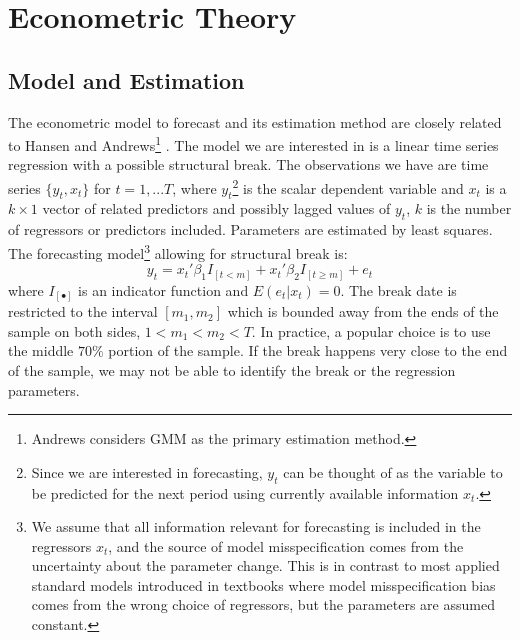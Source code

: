 \section{Econometric Theory}
\subsection{Model and Estimation}
The econometric model to forecast and its estimation method are closely related to Hansen \cite{hansen2009averaging} and Andrews\footnote{Andrews considers GMM as the primary estimation method.} \cite{andrews93}. The model we are interested in is a linear time series regression with a possible structural break. The observations we have are time series $\{y_t,x_t\}$ for $t = 1,...T$, where $y_t$\footnote{Since we are interested in forecasting, $y_t$ can be thought of as the variable to be predicted for the next period using currently available information $x_t$.} is the scalar dependent variable and $x_t$ is a $k\times 1$ vector of related predictors and possibly lagged values of $y_t$, $k$ is the number of regressors or predictors included. Parameters are estimated by least squares. The forecasting model\footnote{We assume that all information relevant for forecasting is included in the regressors $x_t$, and the source of model misspecification comes from the uncertainty about the parameter change. This is in contrast to most applied standard models introduced in textbooks where model misspecification bias comes from the wrong choice of regressors, but the parameters are assumed constant.} allowing for structural break is:
\begin{equation}
	y_t = x_t'\beta_1 I_{[t<m]} + x_t'\beta_2 I_{[t \geq m]} + e_t
\end{equation}
where $I_{[\bullet]}$ is an indicator function and $E(e_t|x_t) = 0$. The break date is restricted to the interval $[m_1,m_2]$ which is bounded away from the ends of the sample on both sides, $1 < m_{1} < m_{2} < T$. In practice, a popular choice is to use the middle $70\%$ portion of the sample. If the break happens very close to the end of the sample, we may not be able to identify the break or the regression parameters.

